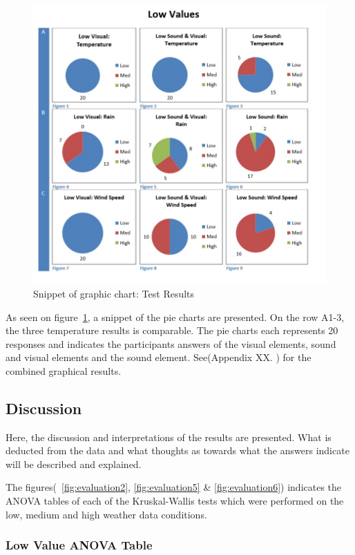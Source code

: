 \begin{figure}[!htbp]
    \centering
    \includegraphics[width=.7\textwidth]{images/Evaluation4.jpg}
    \caption{Snippet of graphic chart: Test Results}
    \label{fig:evaluation4}
\end{figure}

As seen on figure~\ref{fig:evaluation4}, a snippet of the pie charts are presented. 
On the row A1-3, the three temperature results is comparable. 
The pie charts each represents 20 responses and indicates the participants answers of the visual elements, sound and visual elements and the sound element. 
See(Appendix XX. ) for the combined graphical results.




\subsection{Discussion} %
\label{sub:discussion}

Here, the discussion and interpretations of the results are presented. 
What is deducted from the data and what thoughts as towards what the answers indicate will be described and explained.

The figures(~\ref{fig:evaluation2}, \ref*{fig:evaluation5} \&  \ref*{fig:evaluation6}) indicates the ANOVA tables of each of the Kruskal-Wallis tests which were performed on the low, medium and high weather data conditions.

\subsubsection*{Low Value ANOVA Table} %
\label{ssub:low_value_anova_table}

